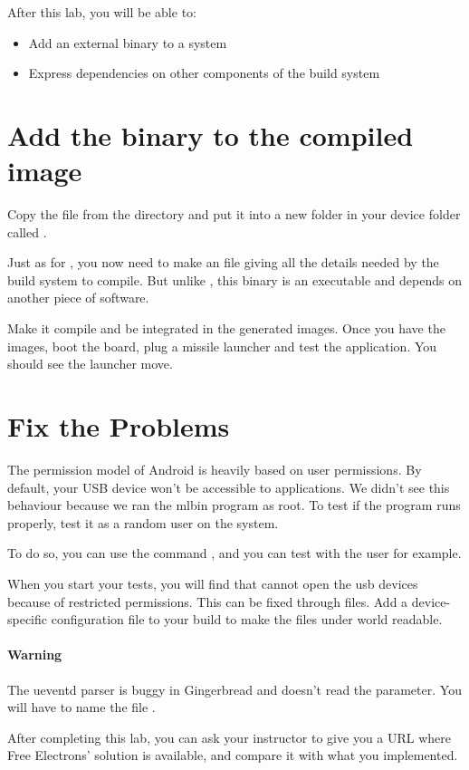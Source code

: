 
After this lab, you will be able to:
\begin{itemize}
  \item Add an external binary to a system
  \item Express dependencies on other components of the build system
\end{itemize}

\section{Add the binary to the compiled image}
Copy the  file from the
 directory and put it into a new
folder in your device folder called .

Just as for , you now need to make an  file
giving all the details needed by the build system to compile. But
unlike , this binary is an executable and depends on another
piece of software.

Make it compile and be integrated in the generated images. Once you
have the images, boot the board, plug a missile launcher and test the
application. You should see the launcher move.

\section{Fix the Problems}

The permission model of Android is heavily based on user
permissions. By default, your USB device won't be accessible to
applications. We didn't see this behaviour because we ran the mlbin
program as root. To test if the program runs properly, test it as a
random user on the system.

To do so, you can use the command , and you can test with the
user  for example.

When you start your tests, you will find that  cannot
open the usb devices because of restricted permissions. This can be
fixed through  files. Add a device-specific
 configuration file to your build to make the files
under  world readable.

\paragraph{Warning} The ueventd parser is buggy in Gingerbread and
doesn't read the  parameter. You will have
to name the file .

After completing this lab, you can ask your instructor to
give you a URL where Free Electrons' solution is available, and compare
it with what you implemented.
